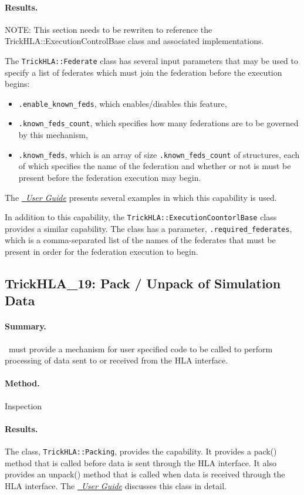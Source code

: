 \paragraph{Results.}
NOTE: This section needs to be rewriten to reference the
TrickHLA::ExecutionControlBase class and associated implementations.

The {\tt TrickHLA::Federate} class has several input parameters that
may be used to specify a list of federates which must join the federation
before the execution begins:
\begin{itemize}
\item{
  {\tt .enable\_known\_feds}, which enables/disables this feature,
}
\item{
  {\tt .known\_feds\_count}, which specifies how many federations are
  to be governed by this mechanism,
}
\item{
  {\tt .known\_feds}, which is an array of size
  {\tt .known\_feds\_count} of structures, each of which specifies
  the name of the federation and whether or not is must be present
  before the federation execution may begin.
}
\end{itemize}
The \href{file:TrickHLAUser.pdf} {\em \TrickHLA\ User Guide}
presents several examples in which this capability
is used.

In addition to this capability, the {\tt TrickHLA::ExecutionCoontorlBase}
class provides a similar capability.
The class has a parameter, {\tt .required\_federates}, which is a
comma-separated list of the names of the federates that must be
present in order for the federation execution to begin.

\subsection{TrickHLA\_19: Pack / Unpack of Simulation Data}
\paragraph{Summary.}
\TrickHLA\ must provide a mechanism for user specified code to be called to
perform processing of data sent to or received from the HLA interface.
\paragraph{Method.} Inspection
\paragraph{Results.}
The class, {\tt TrickHLA::Packing}, provides the capability. It provides a
pack() method that is called before data is sent through the HLA interface.  
It also provides an unpack() method that is called when data is received 
through the HLA interface.
The \href{file:TrickHLAUser.pdf} {\em \TrickHLA\ User Guide}
discusses this class in detail.

